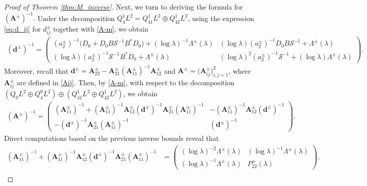 \documentclass[reqno]{amsart}
\numberwithin{equation}{section}
\begin{document}
\begin{proof}[Proof of Theorem \ref{thm:M_inverse}]
		Next, we turn to deriving the formula for $	(\mathbf{A}^{\pm})^{-1}.$
		Under the decomposition $Q_4^1 L^2 = Q_{41}^1 L^2 \oplus Q_{42}^1 L^2$, using the expression \eqref{eq:d_ij} for $d_{ij}^\pm$ together with \eqref{A-m}, we obtain
		\begin{align*}
			(\boldsymbol{d}^\pm)^{-1} 
			= \begin{pmatrix}
				(a_2^\pm)^{-1}\bigl(D_0 + D_0 B \mathcal{S}^{-1} B^* D_0\bigr) + (\log \lambda)^{-1}\Lambda^\pm(\lambda) & (\log \lambda) (a_2^\pm)^{-1}D_0 B \mathcal{S}^{-1} + \Lambda^\pm(\lambda) \\[4pt]
				(\log \lambda) (a_2^\pm)^{-1}\mathcal{S}^{-1} B^* D_0 + \Lambda^\pm(\lambda) & (\log \lambda)^2 (a_2^\pm)^{-1}\mathcal{S}^{-1} + (\log \lambda)\Lambda^\pm(\lambda)
			\end{pmatrix}.
		\end{align*}
		Moreover, recall that $\boldsymbol{d}^\pm = \mathbf{A}_{22}^{\pm} - \mathbf{A}_{21}^{\pm} (\mathbf{A}_{11}^{\pm})^{-1} \mathbf{A}_{12}^{\pm}$ and $\mathbf{A}^{\pm} = \bigl( \mathbf{A}_{ij}^{\pm}\bigr)_{i,j=1}^2$, where  $\mathbf{A}_{ij}^{\pm}$ are defined in \eqref{Aij}. Then, by \eqref{A-m}, with respect to the decomposition \( (Q_0 L^2 \oplus Q_4^0 L^2)\oplus (Q_{41}^1 L^2 \oplus Q_{42}^1 L^2)\), we obtain
		\begin{align*}
		(\mathbf{A}^{\pm})^{-1} = \begin{pmatrix}
			(\mathbf{A}_{11}^{\pm})^{-1} + (\mathbf{A}_{11}^{\pm})^{-1} \mathbf{A}_{12}^{\pm} (\boldsymbol{d}^\pm)^{-1} \mathbf{A}_{21}^{\pm} (\mathbf{A}_{11}^{\pm})^{-1} & -(\mathbf{A}_{11}^{\pm})^{-1} \mathbf{A}_{12}^{\pm} (\boldsymbol{d}^\pm)^{-1} \\ 
			-(\boldsymbol{d}^\pm)^{-1} \mathbf{A}_{21}^{\pm} (\mathbf{A}_{11}^{\pm})^{-1} & (\boldsymbol{d}^\pm)^{-1}
		\end{pmatrix}.
		\end{align*}
	Direct computations based on the previous inverse bounds reveal that  
		\[
		\begin{aligned}
			(\mathbf{A}_{11}^{\pm})^{-1} + (\mathbf{A}_{11}^{\pm})^{-1} \mathbf{A}_{12}^{\pm} (\boldsymbol{d}^\pm)^{-1} \mathbf{A}_{21}^{\pm} (\mathbf{A}_{11}^{\pm})^{-1}
			&= \begin{pmatrix}
				(\log \lambda)^{-2}\Lambda^\pm(\lambda) & (\log \lambda)^{-1}\Lambda^\pm(\lambda) \\[4pt]
				(\log \lambda)^{-1}\Lambda^\pm(\lambda) & P_{22}^\pm(\lambda)
			\end{pmatrix}, \\[8pt]

\end{aligned}\]
\end{proof}
\end{document}

